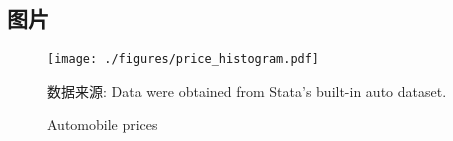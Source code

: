 \newpage
\subsection{图片}

\begin{figure}[H]
\caption{Automobile prices}
\begin{center}
{\texttt{[image: ./figures/price\_histogram.pdf]}}
\end{center}
\footnotesize {数据来源: Data were obtained from Stata's built-in auto dataset.}
\label{fig:price_histogram}
\end{figure}

